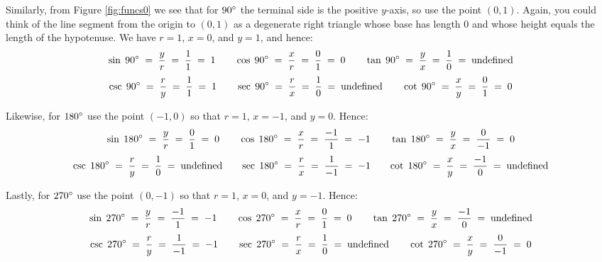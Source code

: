 \begin{exmp}
 Similarly, from Figure \ref{fig:funcs0} we see that for $90^\circ$ the terminal side is the
 positive $y$-axis, so use the point $(0,1)$. Again, you could think of the line segment from the
 origin to $(0,1)$ as a degenerate right triangle whose base has length $0$ and whose height equals
 the length of the hypotenuse. We have $r = 1$, $x = 0$, and $y = 1$, and hence:
 \begin{displaymath}
  \sin\;90\Degrees \;=\; \dfrac{y}{r} \;=\; \dfrac{1}{1} \;=\; 1 \qquad
  \cos\;90\Degrees \;=\; \dfrac{x}{r} \;=\; \dfrac{0}{1} \;=\; 0 \qquad
  \tan\;90\Degrees \;=\; \dfrac{y}{x} \;=\; \dfrac{1}{0} \;=\; \text{undefined}\vspace{1mm}
 \end{displaymath}
 \begin{displaymath}
  \csc\;90\Degrees \;=\; \dfrac{r}{y} \;=\; \dfrac{1}{1} \;=\; 1\qquad
  \sec\;90\Degrees \;=\; \dfrac{r}{x} \;=\; \dfrac{1}{0} \;=\; \text{undefined}\qquad
  \cot\;90\Degrees \;=\; \dfrac{x}{y} \;=\; \dfrac{0}{1} \;=\; 0\vspace{1mm}
 \end{displaymath}
\par\noindent Likewise, for $180^\circ$ use the point $(-1,0)$ so that $r = 1$, $x = -1$, and
$y = 0$. Hence:
 \begin{displaymath}
  \sin\;180\Degrees \;=\; \dfrac{y}{r} \;=\; \dfrac{0}{1} \;=\; 0 \qquad
  \cos\;180\Degrees \;=\; \dfrac{x}{r} \;=\; \dfrac{-1}{1} \;=\; -1 \qquad
  \tan\;180\Degrees \;=\; \dfrac{y}{x} \;=\; \dfrac{0}{-1} \;=\; 0\vspace{1mm}
 \end{displaymath}
 \begin{displaymath}
  \csc\;180\Degrees \;=\; \dfrac{r}{y} \;=\; \dfrac{1}{0} \;=\; \text{undefined}\quad\;\;\;
  \sec\;180\Degrees \;=\; \dfrac{r}{x} \;=\; \dfrac{1}{-1} \;=\; -1\quad\;\;\;
  \cot\;180\Degrees \;=\; \dfrac{x}{y} \;=\; \dfrac{-1}{0} \;=\; \text{undefined}\vspace{1mm}
 \end{displaymath}
\par\noindent Lastly, for $270^\circ$ use the point $(0,-1)$ so that $r = 1$, $x = 0$, and
$y = -1$. Hence:
 \begin{displaymath}
  \sin\;270\Degrees \;=\; \dfrac{y}{r} \;=\; \dfrac{-1}{1} \;=\; -1 \qquad
  \cos\;270\Degrees \;=\; \dfrac{x}{r} \;=\; \dfrac{0}{1} \;=\; 0 \qquad
  \tan\;270\Degrees \;=\; \dfrac{y}{x} \;=\; \dfrac{-1}{0} \;=\; \text{undefined}\vspace{1mm}
 \end{displaymath}
 \begin{displaymath}
  \csc\;270\Degrees \;=\; \dfrac{r}{y} \;=\; \dfrac{1}{-1} \;=\; -1\qquad
  \sec\;270\Degrees \;=\; \dfrac{r}{x} \;=\; \dfrac{1}{0} \;=\; \text{undefined}\qquad
  \cot\;270\Degrees \;=\; \dfrac{x}{y} \;=\; \dfrac{0}{-1} \;=\; 0\vspace{1mm}
 \end{displaymath}
\end{exmp}\vspace{-2mm}
